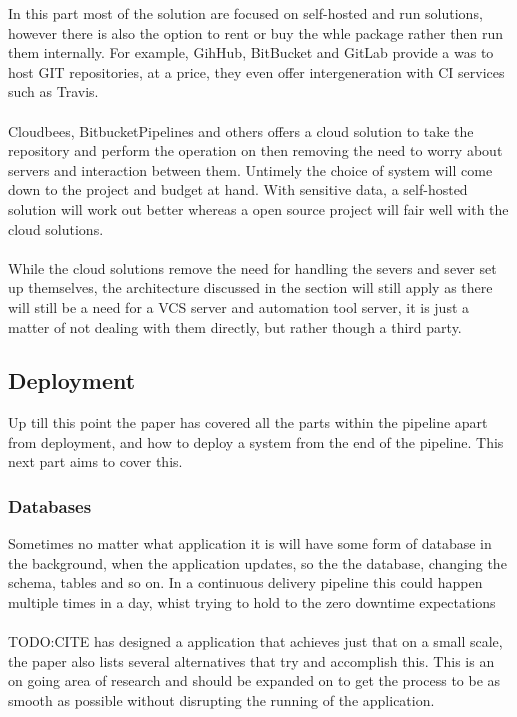 In this part most of the solution are focused on self-hosted and run solutions, however there is also the option to rent or buy the whle package rather then run them internally. For example, GihHub, BitBucket and GitLab provide a was to host GIT repositories, at a price, they even offer intergeneration with CI services such as Travis. 
\\\\
Cloudbees, BitbucketPipelines and others offers a cloud solution to take the repository and perform the operation on then removing the need to worry about servers and interaction between them. Untimely the choice of system will come down to the project and budget at hand. With sensitive data, a self-hosted solution will work out better whereas a open source project will fair well with the cloud solutions.
\\\\
While the cloud solutions remove the need for handling the severs and sever set up themselves, the architecture discussed in the section will still apply as there will still be a need for a VCS server and automation tool server, it is just a matter of not dealing with them directly, but rather though a third party.

\subsection{Deployment}

Up till this point the paper has covered all the parts within the pipeline apart from deployment, and how to deploy a system from the end of the pipeline. This next part aims to cover this.

\subsubsection{Databases}
Sometimes no matter what application it is will have some form of database in the background, when the application updates, so the the database, changing the schema, tables and so on. In a continuous delivery pipeline this could happen multiple times in a day, whist trying to hold to the zero downtime expectations
\\\\
TODO:CITE has designed a application that achieves just that on a small scale, the paper also lists several alternatives that try and accomplish this. This is an on going area of research and should be expanded on to get the process to be as smooth as possible without disrupting the running of the application.  

